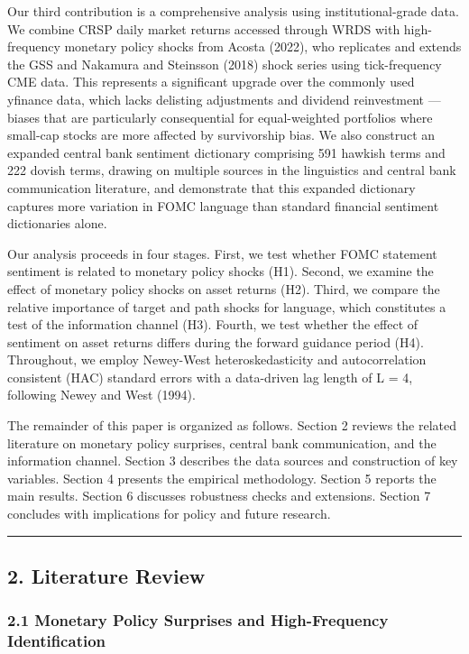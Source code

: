 \documentclass[
]{article}
\begin{document}
Our third contribution is a comprehensive analysis using
institutional-grade data. We combine CRSP daily market returns accessed
through WRDS with high-frequency monetary policy shocks from Acosta
(2022), who replicates and extends the GSS and Nakamura and Steinsson
(2018) shock series using tick-frequency CME data. This represents a
significant upgrade over the commonly used yfinance data, which lacks
delisting adjustments and dividend reinvestment --- biases that are
particularly consequential for equal-weighted portfolios where small-cap
stocks are more affected by survivorship bias. We also construct an
expanded central bank sentiment dictionary comprising 591 hawkish terms
and 222 dovish terms, drawing on multiple sources in the linguistics and
central bank communication literature, and demonstrate that this
expanded dictionary captures more variation in FOMC language than
standard financial sentiment dictionaries alone.

Our analysis proceeds in four stages. First, we test whether FOMC
statement sentiment is related to monetary policy shocks (H1). Second,
we examine the effect of monetary policy shocks on asset returns (H2).
Third, we compare the relative importance of target and path shocks for
language, which constitutes a test of the information channel (H3).
Fourth, we test whether the effect of sentiment on asset returns differs
during the forward guidance period (H4). Throughout, we employ
Newey-West heteroskedasticity and autocorrelation consistent (HAC)
standard errors with a data-driven lag length of L = 4, following Newey
and West (1994).

The remainder of this paper is organized as follows. Section 2 reviews
the related literature on monetary policy surprises, central bank
communication, and the information channel. Section 3 describes the data
sources and construction of key variables. Section 4 presents the
empirical methodology. Section 5 reports the main results. Section 6
discusses robustness checks and extensions. Section 7 concludes with
implications for policy and future research.

\begin{center}\rule{0.5\linewidth}{0.5pt}\end{center}

\subsection{2. Literature Review}\label{literature-review}

\subsubsection{2.1 Monetary Policy Surprises and High-Frequency
Identification}\label{monetary-policy-surprises-and-high-frequency-identification}
\end{document}
